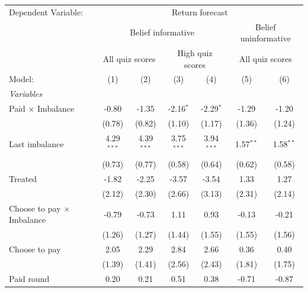 \begingroup
\centering
\begin{tabular}{lcccccc}
   \tabularnewline \midrule \midrule
   Dependent Variable: & \multicolumn{6}{c}{Return forecast}\\
    & \multicolumn{4}{c}{Belief informative} & \multicolumn{2}{c}{Belief uninformative} \\ 
    & \multicolumn{2}{c}{All quiz scores} & \multicolumn{2}{c}{High quiz scores} & \multicolumn{2}{c}{All quiz scores} \\ 
   Model:                            & (1)           & (2)           & (3)           & (4)           & (5)           & (6)\\  
   \midrule
   \emph{Variables}\\
   Paid $\times$ Imbalance           & -0.80         & -1.35         & -2.16$^{*}$   & -2.29$^{*}$   & -1.29         & -1.20\\   
                                     & (0.78)        & (0.82)        & (1.10)        & (1.17)        & (1.36)        & (1.24)\\   
   Last imbalance                    & 4.29$^{***}$  & 4.39$^{***}$  & 3.75$^{***}$  & 3.94$^{***}$  & 1.57$^{**}$   & 1.58$^{**}$\\   
                                     & (0.73)        & (0.77)        & (0.58)        & (0.64)        & (0.62)        & (0.58)\\   
   Treated                           & -1.82         & -2.25         & -3.57         & -3.54         & 1.33          & 1.27\\   
                                     & (2.12)        & (2.30)        & (2.66)        & (3.13)        & (2.31)        & (2.14)\\   
   Choose to pay $\times$ Imbalance  & -0.79         & -0.73         & 1.11          & 0.93          & -0.13         & -0.21\\   
                                     & (1.26)        & (1.27)        & (1.44)        & (1.55)        & (1.55)        & (1.56)\\   
   Choose to pay                     & 2.05          & 2.29          & 2.84          & 2.66          & 0.36          & 0.40\\   
                                     & (1.39)        & (1.41)        & (2.56)        & (2.43)        & (1.81)        & (1.75)\\   
   Paid round                        & 0.20          & 0.21          & 0.51          & 0.38          & -0.71         & -0.87\\   

\end{tabular}
